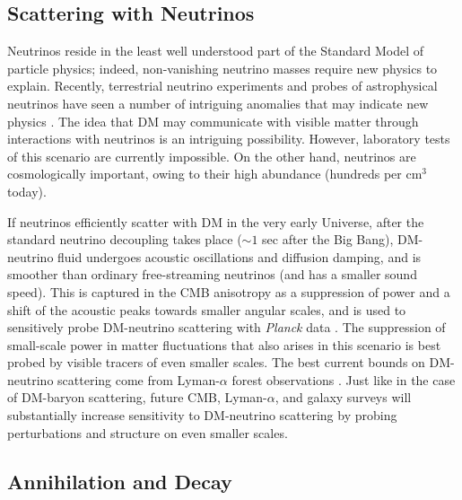 \documentclass[12pt]{article}
\begin{document}
\subsection{Scattering with Neutrinos}

Neutrinos reside in the least well understood part of the Standard Model of particle physics; indeed, non-vanishing neutrino masses require new physics to explain. 
Recently, terrestrial neutrino experiments and probes of astrophysical neutrinos have seen a number of intriguing anomalies that may indicate new physics \cite{2018arXiv180512028M, 2018arXiv180909615F}.
The idea that DM may communicate with visible matter through interactions with neutrinos is an intriguing possibility. 
However, laboratory tests of this scenario are currently impossible.
On the other hand, neutrinos are cosmologically important, owing to their high abundance (hundreds per cm$^3$ today).

If neutrinos efficiently scatter with DM in the very early Universe, after the standard neutrino decoupling takes place ($\sim 1$ sec after the Big Bang), DM-neutrino fluid undergoes acoustic oscillations and diffusion damping, and is smoother than ordinary free-streaming neutrinos (and has a smaller sound speed).
This is captured in the CMB anisotropy as a suppression of power and a shift of the acoustic peaks towards smaller angular scales, and is used to sensitively probe DM-neutrino scattering with \textit{Planck} data \cite{Boehm:2001hm,Mangano:2006mp,Escudero:2015yka,DiValentino:2017oaw,Diacoumis:2018ezi}.
The suppression of small-scale power in matter fluctuations that also arises in this scenario is best probed by visible tracers of even smaller scales.
The best current bounds on DM-neutrino scattering come from Lyman-$\alpha$ forest observations \cite{Wilkinson:2014ksa}.
Just like in the case of DM-baryon scattering, future CMB, Lyman-$\alpha$, and galaxy surveys will substantially increase sensitivity to DM-neutrino scattering by probing perturbations and structure on even smaller scales.

\vspace{-0.3cm}
\subsection{Annihilation and Decay}
\end{document}
